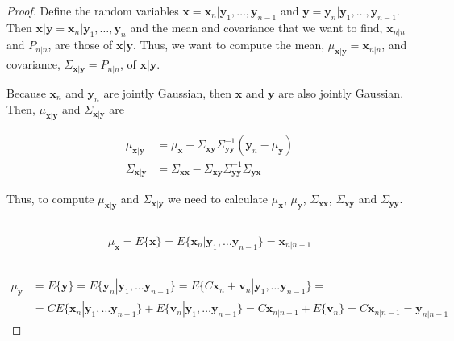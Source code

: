 \documentclass[12pt]{article}
\begin{document}
\begin{proof}

    Define the random variables
    $\mathbf{x}=\mathbf{x}_n|\mathbf{y}_1,\ldots,\mathbf{y}_{n-1}$ and
    $\mathbf{y}=\mathbf{y}_n|\mathbf{y}_1,\ldots,\mathbf{y}_{n-1}$. Then
    $\mathbf{x}|\mathbf{y}=\mathbf{x}_n|\mathbf{y}_1,\ldots,\mathbf{y}_n$ and
    the mean and covariance that we want to find, $\mathbf{x}_{n|n}$ and
    $P_{n|n}$, are those of $\mathbf{x}|\mathbf{y}$.  Thus, we want to compute
    the mean, $\mu_{\mathbf{x}|\mathbf{y}}=\mathbf{x}_{n|n}$, and covariance,
    $\Sigma_{\mathbf{x}|\mathbf{y}}=P_{n|n}$, of $\mathbf{x}|\mathbf{y}$.

    Because $\mathbf{x}_n$ and $\mathbf{y}_n$ are jointly Gaussian, then
    $\mathbf{x}$ and $\mathbf{y}$ are also jointly Gaussian. Then, $\mu_{\mathbf{x}|\mathbf{y}}$
    and $\Sigma_{\mathbf{x}|\mathbf{y}}$ are \citep[][Chapter 2]{bishop06}

    \begin{align}
        \mu_{\mathbf{x}|\mathbf{y}}&=\mu_{\mathbf{x}} +
        \Sigma_{\mathbf{x}\mathbf{y}}\Sigma_{\mathbf{y}\mathbf{y}}^{-1}(\mathbf{y}_n-\mu_{\mathbf{y}})\label{eq:muxgy}\\
        \Sigma_{\mathbf{x}|\mathbf{y}}&=\Sigma_{\mathbf{x}\mathbf{x}}-\Sigma_{\mathbf{x}\mathbf{y}}\Sigma_{\mathbf{y}\mathbf{y}}^{-1}\Sigma_{\mathbf{y}\mathbf{x}}\label{eq:sigmaxgy}
    \end{align}

    Thus, to compute $\mu_{\mathbf{x}|\mathbf{y}}$ and $\Sigma_{\mathbf{x}|\mathbf{y}}$ we need to calculate
    $\mu_{\mathbf{x}}$, $\mu_{\mathbf{y}}$, $\Sigma_{\mathbf{x}\mathbf{x}}$, $\Sigma_{\mathbf{x}\mathbf{y}}$ and $\Sigma_{\mathbf{y}\mathbf{y}}$.

    \rule{2in}{0.4pt}

    \begin{align}
        \mu_{\mathbf{x}}=E\{\mathbf{x}\}=E\{\mathbf{x}_n|\mathbf{y}_1,\ldots\mathbf{y}_{n-1}\}=\mathbf{x}_{n|n-1}\label{eq:mux}
    \end{align}

    \rule{2in}{0.4pt}

    \begin{align}
        \mu_{\mathbf{y}}&=E\{\mathbf{y}\}=E\{\mathbf{y}_n|\mathbf{y}_1,\ldots\mathbf{y}_{n-1}\}=E\{C\mathbf{x}_n+\mathbf{v}_n|\mathbf{y}_1,\ldots\mathbf{y}_{n-1}\}=\nonumber\\
             &=CE\{\mathbf{x}_n|\mathbf{y}_1,\ldots\mathbf{y}_{n-1}\}+E\{\mathbf{v}_n|\mathbf{y}_1,\ldots\mathbf{y}_{n-1}\}=C\mathbf{x}_{n|n-1}+E\{\mathbf{v}_n\}=C\mathbf{x}_{n|n-1}=\mathbf{y}_{n|n-1}\label{eq:muy}
    \end{align}


\end{proof}
\end{document}
